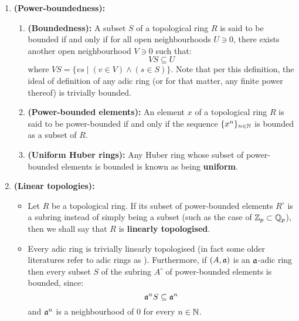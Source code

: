             \begin{definition} \label{def: power_bounded_elements}
                \noindent
                \begin{enumerate}
                    \item \textbf{(Power-boundedness):} 
                        \begin{enumerate}
                            \item \textbf{(Boundedness):} A subset $S$ of a topological ring $R$ is said to be bounded if and only if for all open neighbourhoods $U \ni 0$, there exists another open neighbourhood $V \ni 0$ such that:
                                $$VS \subseteq U$$
                            where $VS = \{v s \mid (v \in V) \wedge (s \in S)\}$. Note that per this definition, the ideal of definition of any adic ring (or for that matter, any finite power thereof) is trivially bounded. 
                            \item \textbf{(Power-bounded elements):} An element $x$ of a topological ring $R$ is said to be power-bounded if and only if the sequence $\{x^n\}_{n \in \mathbb{N}}$ is bounded as a subset of $R$.
                            \item \textbf{(Uniform Huber rings):} Any Huber ring whose subset of power-bounded elements is bounded is known as being \textbf{uniform}.
                        \end{enumerate}
                    \item \textbf{(Linear topologies):} 
                        \begin{itemize}
                            \item Let $R$ be a topological ring. If its subset of power-bounded elements $R^{\circ}$ is a subring instead of simply being a subset (such as the case of $\mathbb{Z}_p \subset \mathbb{Q}_p$), then we shall say that $R$ is \textbf{linearly topologised}. 
                            \item Every adic ring is trivially linearly topologised (in fact some older literatures refer to adic rings as ). Furthermore, if $(A, \mathfrak{a})$ is an $\mathfrak{a}$-adic ring then every subset $S$ of the subring $A^{\circ}$ of power-bounded elements is bounded, since:
                                $$\mathfrak{a}^n S \subseteq \mathfrak{a}^n$$
                            and $\mathfrak{a}^n$ is a neighbourhood of $0$ for every $n \in \mathbb{N}$. 
                        \end{itemize}
                \end{enumerate}
            \end{definition}
            
